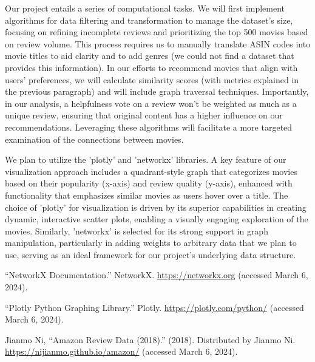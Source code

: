\documentclass[fontsize=11pt]{article}
\begin{document}
\noindent Our project entails a series of computational tasks. We will first implement algorithms for data filtering and transformation to manage the dataset's size, focusing on refining incomplete reviews and prioritizing the top 500 movies based on review volume. This process requires us to manually translate ASIN codes into movie titles to aid clarity and to add genres (we could not find a dataset that provides this information). In our efforts to recommend movies that align with users' preferences, we will calculate similarity scores (with metrics explained in the previous paragraph) and will include graph traversal techniques. Importantly, in our analysis, a helpfulness vote on a review won't be weighted as much as a unique review, ensuring that original content has a higher influence on our recommendations. Leveraging these algorithms will facilitate a more targeted examination of the connections between movies.
\vspace{0.6cm}

\noindent We plan to utilize the 'plotly' and 'networkx' libraries. A key feature of our visualization approach includes a quadrant-style graph that categorizes movies based on their popularity (x-axis) and review quality (y-axis), enhanced with functionality that emphasizes similar movies as users hover over a title. The choice of 'plotly' for visualization is driven by its superior capabilities in creating dynamic, interactive scatter plots, enabling a visually engaging exploration of the movies. Similarly, 'networkx' is selected for its strong support in graph manipulation, particularly in adding weights to arbitrary data that we plan to use, serving as an ideal framework for our project's underlying data structure.

\begin{thebibliography}{9}

``NetworkX Documentation.'' NetworkX. \url{https://networkx.org} (accessed March 6, 2024).

``Plotly Python Graphing Library.'' Plotly. \url{https://plotly.com/python/} (accessed March 6, 2024).

Jianmo Ni, ``Amazon Review Data (2018).'' (2018). Distributed by Jianmo Ni. \url{https://nijianmo.github.io/amazon/} (accessed March 6, 2024).

\end{thebibliography}


\end{document}

